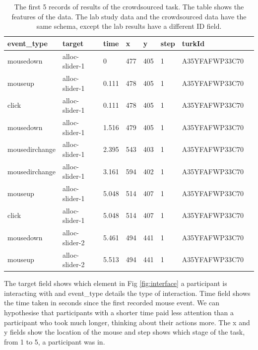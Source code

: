 \documentclass{article}
\begin{document}
\begin{table}[ht]
    \caption{\label{table:data} The first 5 records of results of the crowdsourced task.
        The table shows the features of the data.
        The lab study data and the crowdsourced data have the same schema, except the lab results have a different ID field.
    }
    \begin{tabular}{llllllll}
        \hline
        event\_type    & target         & time  & x   & y   & step & turkId         \\ \hline
        mousedown      & alloc-slider-1 & 0     & 477 & 405 & 1    & A35YFAFWP33C70 \\
        mouseup        & alloc-slider-1 & 0.111 & 478 & 405 & 1    & A35YFAFWP33C70 \\
        click          & alloc-slider-1 & 0.111 & 478 & 405 & 1    & A35YFAFWP33C70 \\
        mousedown      & alloc-slider-1 & 1.516 & 479 & 405 & 1    & A35YFAFWP33C70 \\
        mousedirchange & alloc-slider-1 & 2.395 & 543 & 403 & 1    & A35YFAFWP33C70 \\
        mousedirchange & alloc-slider-1 & 3.161 & 594 & 402 & 1    & A35YFAFWP33C70 \\
        mouseup        & alloc-slider-1 & 5.048 & 514 & 407 & 1    & A35YFAFWP33C70 \\
        click          & alloc-slider-1 & 5.048 & 514 & 407 & 1    & A35YFAFWP33C70 \\
        mousedown      & alloc-slider-2 & 5.461 & 494 & 441 & 1    & A35YFAFWP33C70 \\
        mouseup        & alloc-slider-2 & 5.513 & 494 & 441 & 1    & A35YFAFWP33C70 \\ \hline
    \end{tabular}
\end{table}

The target field shows which element in Fig \ref{fig:interface} a participant is interacting with and event\_type details the type of interaction.
Time field shows the time taken in seconds since the first recorded mouse event.
We can hypothesise that participants with a shorter time paid less attention than a participant who took much longer, thinking about their actions more.
The x and y fields show the location of the mouse and step shows which stage of the task, from 1 to 5, a participant was in.


\end{document}
